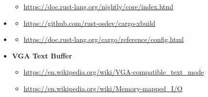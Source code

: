 \documentclass{article}
\begin{document}
\begin{itemize}
    \begin{itemize}
        \item \url{https://doc.rust-lang.org/nightly/core/index.html}
    \end{itemize}
    \item \hypertarget{ref:cargo-xbuild}{\textbf{\color{medium}{Cargo XBuild}}}
    \begin{itemize}
        \item \url{https://github.com/rust-osdev/cargo-xbuild}
    \end{itemize}
    \item \hypertarget{ref:cargo-config}{\textbf{\color{medium}{Cargo Config}}}
    \begin{itemize}
        \item \url{https://doc.rust-lang.org/cargo/reference/config.html}
    \end{itemize}
    \item \hypertarget{ref:vga}{\textbf{\color{medium}VGA Text Buffer}}
    \begin{itemize}
       \item \url{https://en.wikipedia.org/wiki/VGA-compatible_text_mode} 
       \item \url{https://en.wikipedia.org/wiki/Memory-mapped_I/O}
    \end{itemize}
 \end{itemize}
\end{document}
